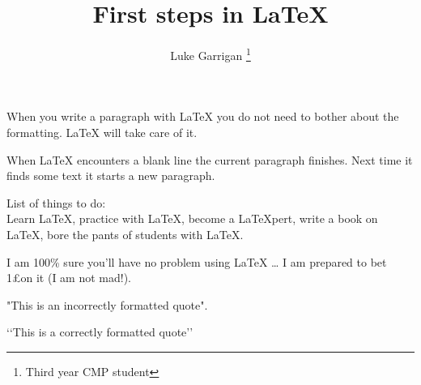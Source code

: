 \documentclass[12pt]{scrartcl}
\title{First steps in \LaTeX}
\author{Luke Garrigan
\thanks{Third year CMP student}}
\begin{document}
\maketitle
When you write a
paragraph with \LaTeX{} you do not need to
bother about the formatting. \LaTeX{} will
take care of it.



When \LaTeX{} encounters a blank line
the current paragraph finishes.
Next time it finds some text it starts a new paragraph.


List of things to do:\\
Learn \LaTeX, practice with \LaTeX ,
become a \LaTeX{}pert,
write a book on \LaTeX ,
bore the pants of students with \LaTeX.


I am 100\% sure you’ll have no problem
using \LaTeX{} \ldots{} I am prepared to bet
1\pounds on it (I am not mad!). 

"This is an incorrectly formatted quote".

‘‘This is a correctly formatted quote’’
\end{document}
